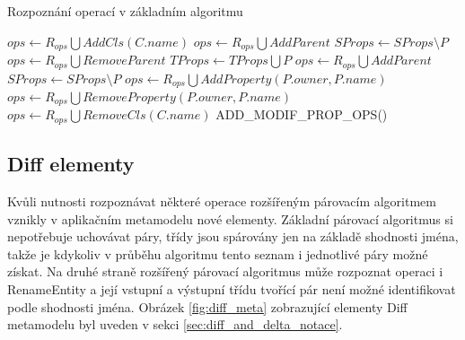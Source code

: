\documentclass[11pt,twoside,a4paper]{book}
\begin{document}
\begin{algorithm}
 \caption{Rozpoznání operací v základním
 algoritmu}\label{algo:matching:ops_recognition}

\begin{algorithmic}[1]
   \Statex
   \State $ops \gets R_{ops} \bigcup AddCls(C.name)$
   \EndFor
   \Statex
    
         \State $ops \gets R_{ops} \bigcup AddParent$
            \State $SProps \gets SProps \setminus P$
         \EndFor
      \EndIf
   \EndFor
   \Statex
    
         \State $ops \gets R_{ops} \bigcup RemoveParent$
            \State $TProps \gets TProps \bigcup P$
         \EndFor
      \EndIf
   \EndFor
   \Statex
    
            \State $ops \gets R_{ops} \bigcup AddParent$
               \State $SProps \gets SProps \setminus P$
            \EndFor
         \EndIf
      \EndFor
   \EndFor
   \Statex
   \State $ops \gets R_{ops} \bigcup AddProperty(P.owner, P.name)$
   \EndFor
   \Statex
   \State $ops \gets R_{ops} \bigcup RemoveProperty(P.owner, P.name)$
   \EndFor
   \Statex
   \State $ops \gets R_{ops} \bigcup RemoveCls(C.name)$
   \EndFor   
   \Statex
   \State ADD\_MODIF\_PROP\_OPS()
   \EndProcedure
\end{algorithmic}
\end{algorithm}

\FloatBarrier

\subsection{Diff elementy}\label{subsect:Diff elementy}
 
 Kvůli nutnosti rozpoznávat některé operace rozšířeným párovacím
 algoritmem vznikly v aplikačním metamodelu nové elementy. Základní párovací
 algoritmus si nepotřebuje uchovávat páry, třídy jsou spárovány jen na základě
 shodnosti jména, takže je kdykoliv v průběhu algoritmu tento seznam i
 jednotlivé páry možné získat. Na druhé straně rozšířený párovací algoritmus
 může rozpoznat operaci i RenameEntity a její vstupní a výstupní třídu tvořící
 pár není možné identifikovat podle shodnosti jména. Obrázek \ref{fig:diff_meta}
 zobrazující elementy Diff metamodelu byl uveden v sekci
 \ref{sec:diff_and_delta_notace}.
 
\end{document}
